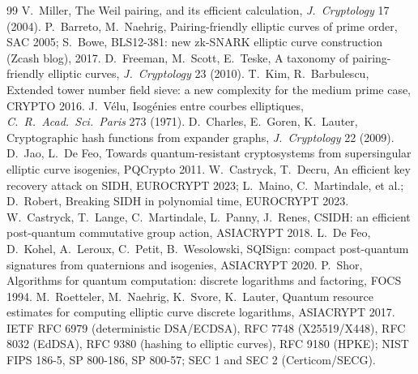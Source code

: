 \documentclass[11pt,a4paper,oneside]{book}
\theoremstyle{plain}
\theoremstyle{definition}
\theoremstyle{remark}
\begin{document}
\begin{thebibliography}{99}
 V.~Miller, The Weil pairing, and its efficient calculation, \emph{J.\ Cryptology} 17 (2004).
 P.~Barreto, M.~Naehrig, Pairing-friendly elliptic curves of prime order, SAC 2005; S.~Bowe, BLS12-381: new zk-SNARK elliptic curve construction (Zcash blog), 2017.
 D.~Freeman, M.~Scott, E.~Teske, A taxonomy of pairing-friendly elliptic curves, \emph{J.\ Cryptology} 23 (2010).
 T.~Kim, R.~Barbulescu, Extended tower number field sieve: a new complexity for the medium prime case, CRYPTO 2016.
 J.~V\'elu, Isog\'enies entre courbes elliptiques, \emph{C.\ R.\ Acad.\ Sci.\ Paris} 273 (1971).
 D.~Charles, E.~Goren, K.~Lauter, Cryptographic hash functions from expander graphs, \emph{J.\ Cryptology} 22 (2009).
 D.~Jao, L.~De Feo, Towards quantum-resistant cryptosystems from supersingular elliptic curve isogenies, PQCrypto 2011.
 W.~Castryck, T.~Decru, An efficient key recovery attack on SIDH, EUROCRYPT 2023; L.~Maino, C.~Martindale, et al.; D.~Robert, Breaking SIDH in polynomial time, EUROCRYPT 2023.
 W.~Castryck, T.~Lange, C.~Martindale, L.~Panny, J.~Renes, CSIDH: an efficient post-quantum commutative group action, ASIACRYPT 2018.
 L.~De Feo, D.~Kohel, A.~Leroux, C.~Petit, B.~Wesolowski, SQISign: compact post-quantum signatures from quaternions and isogenies, ASIACRYPT 2020.
 P.~Shor, Algorithms for quantum computation: discrete logarithms and factoring, FOCS 1994.
 M.~Roetteler, M.~Naehrig, K.~Svore, K.~Lauter, Quantum resource estimates for computing elliptic curve discrete logarithms, ASIACRYPT 2017.
 IETF RFC 6979 (deterministic DSA/ECDSA), RFC 7748 (X25519/X448), RFC 8032 (EdDSA), RFC 9380 (hashing to elliptic curves), RFC 9180 (HPKE); NIST FIPS 186-5, SP 800-186, SP 800-57; SEC 1 and SEC 2 (Certicom/SECG).
\end{thebibliography}
\end{document}
